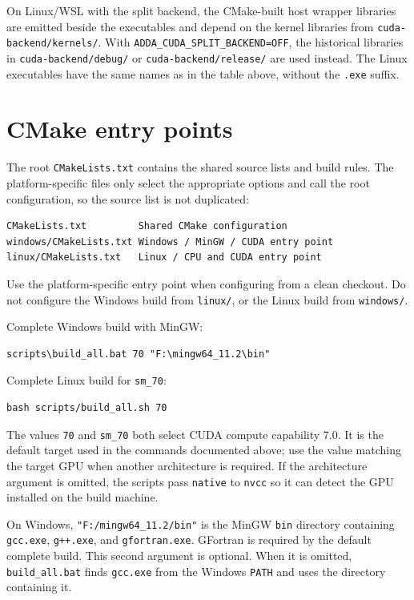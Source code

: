 \documentclass[11pt,a4paper]{article}
\newcommand{\code}[1]{\nolinkurl{#1}}
\begin{document}
On Linux/WSL with the split backend, the CMake-built host wrapper libraries
are emitted beside the executables and depend on the kernel libraries from
\code{cuda-backend/kernels/}. With \code{ADDA_CUDA_SPLIT_BACKEND=OFF}, the
historical libraries in \code{cuda-backend/debug/} or
\code{cuda-backend/release/} are used instead. The Linux executables have the
same names as in the table above, without the \code{.exe} suffix.

\section{CMake entry points}

The root \code{CMakeLists.txt} contains the shared source lists and build rules.
The platform-specific files only select the appropriate options and call the
root configuration, so the source list is not duplicated:

\begin{lstlisting}
CMakeLists.txt         Shared CMake configuration
windows/CMakeLists.txt Windows / MinGW / CUDA entry point
linux/CMakeLists.txt   Linux / CPU and CUDA entry point
\end{lstlisting}

Use the platform-specific entry point when configuring from a clean checkout.
Do not configure the Windows build from \code{linux/}, or the Linux build from
\code{windows/}.

Complete Windows build with MinGW:

\begin{lstlisting}
scripts\build_all.bat 70 "F:\mingw64_11.2\bin"
\end{lstlisting}

Complete Linux build for \code{sm_70}:

\begin{lstlisting}
bash scripts/build_all.sh 70
\end{lstlisting}

The values \code{70} and \code{sm_70} both select CUDA compute capability 7.0.
It is the default target used in the commands documented above; use the value
matching the target GPU when another architecture is required. If the
architecture argument is omitted, the scripts pass \code{native} to
\code{nvcc} so it can detect the GPU installed on the build machine.

On Windows, \code{"F:/mingw64_11.2/bin"} is the MinGW \code{bin} directory
containing \code{gcc.exe}, \code{g++.exe}, and \code{gfortran.exe}. GFortran is
required by the default complete build. This second argument is optional. When
it is omitted, \code{build_all.bat} finds \code{gcc.exe} from the Windows
\code{PATH} and uses the directory containing it.
\end{document}

